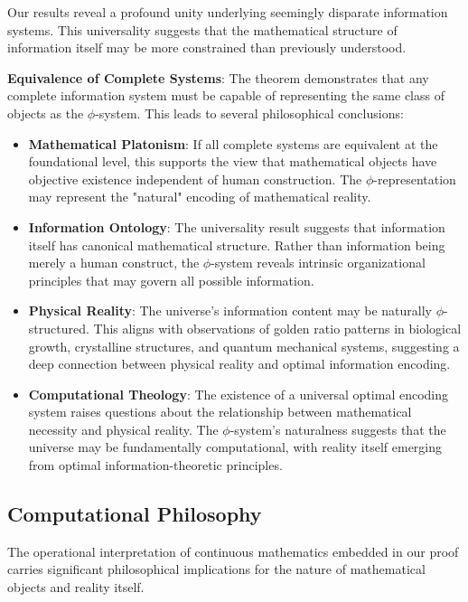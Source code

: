 \documentclass[12pt,letterpaper]{article}
\begin{document}
Our results reveal a profound unity underlying seemingly disparate information systems. This universality suggests that the mathematical structure of information itself may be more constrained than previously understood.

\textbf{Equivalence of Complete Systems}: The theorem demonstrates that any complete information system must be capable of representing the same class of objects as the $\phi$-system. This leads to several philosophical conclusions:

\begin{itemize}
\item \textbf{Mathematical Platonism}: If all complete systems are equivalent at the foundational level, this supports the view that mathematical objects have objective existence independent of human construction. The $\phi$-representation may represent the "natural" encoding of mathematical reality.

\item \textbf{Information Ontology}: The universality result suggests that information itself has canonical mathematical structure. Rather than information being merely a human construct, the $\phi$-system reveals intrinsic organizational principles that may govern all possible information.

\item \textbf{Physical Reality}: The universe's information content may be naturally $\phi$-structured. This aligns with observations of golden ratio patterns in biological growth, crystalline structures, and quantum mechanical systems, suggesting a deep connection between physical reality and optimal information encoding.

\item \textbf{Computational Theology}: The existence of a universal optimal encoding system raises questions about the relationship between mathematical necessity and physical reality. The $\phi$-system's naturalness suggests that the universe may be fundamentally computational, with reality itself emerging from optimal information-theoretic principles.
\end{itemize}

\subsection{Computational Philosophy}

The operational interpretation of continuous mathematics embedded in our proof carries significant philosophical implications for the nature of mathematical objects and reality itself.
\end{document}
